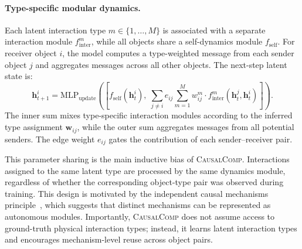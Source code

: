 \documentclass{article}
\newcommand{\ours}{\textsc{CausalComp}}
\begin{document}
\paragraph{Type-specific modular dynamics.}
\label{sec:dynamics}
Each latent interaction type $m \in \{1, \ldots, M\}$ is associated with a separate interaction module $f_\text{inter}^m$, while all objects share a self-dynamics module $f_\text{self}$. For receiver object $i$, the model computes a type-weighted message from each sender object $j$ and aggregates messages across all other objects. The next-step latent state is:
\begin{equation}
    \mathbf{h}_{t+1}^i = \text{MLP}_\text{update}\left(\left[
    f_\text{self}(\mathbf{h}_t^i),\;
    \sum_{j \neq i} e_{ij} \sum_{m=1}^{M} w_{ij}^m \cdot f_\text{inter}^m(\mathbf{h}_t^j, \mathbf{h}_t^i)
    \right]\right).
    \label{eq:dynamics}
\end{equation}
The inner sum mixes type-specific interaction modules according to the inferred type assignment $\mathbf{w}_{ij}$, while the outer sum aggregates messages from all potential senders. The edge weight $e_{ij}$ gates the contribution of each sender--receiver pair.

This parameter sharing is the main inductive bias of \ours{}. Interactions assigned to the same latent type are processed by the same dynamics module, regardless of whether the corresponding object-type pair was observed during training. This design is motivated by the independent causal mechanisms principle~\citep{scholkopf2021causal}, which suggests that distinct mechanisms can be represented as autonomous modules. Importantly, \ours{} does not assume access to ground-truth physical interaction types; instead, it learns latent interaction types and encourages mechanism-level reuse across object pairs.

\end{document}
